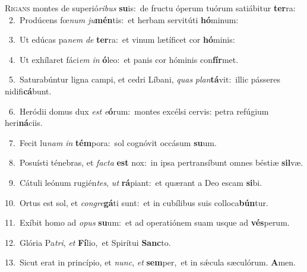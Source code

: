 \lettrine{\initial\textcolor{\initialcolor}{R}}{igans} montes de superió\-\textit{ri}\-\textit{bus} \textbf{su}\-is:~\star de fructu óperum tuórum satiábitur \textbf{ter}\-ra:\\
{\numbfont\textcolor{\numbcolor}{~2.}}~Prodúcens fœ\textit{num} \textit{ju}\-\textbf{mén}tis:~\star et herbam servitúti \textbf{hó}\-minum:\par
{\numbfont\textcolor{\numbcolor}{~3.}}~Ut edúcas pa\textit{nem} \textit{de} \textbf{ter}\-ra:~\star et vinum lætíficet cor \textbf{hó}\-minis:\par
{\numbfont\textcolor{\numbcolor}{~4.}}~Ut exhílaret fáci\textit{em} \textit{in} \textbf{ó}\-leo:~\star et panis cor hóminis con\-\textbf{fír}\-met.\par
{\numbfont\textcolor{\numbcolor}{~5.}}~Saturabúntur ligna campi, et cedri Líbani, \textit{quas} \textit{plan}\-\textbf{tá}vit:~\star illic pásseres nidifi\-\textbf{cá}\-bunt.\par
{\numbfont\textcolor{\numbcolor}{~6.}}~Heródii domus dux \textit{est} \textit{e}\-\textbf{ó}rum:~\star montes excélsi cervis: petra refúgium heri\-\textbf{ná}\-ciis.\par
{\numbfont\textcolor{\numbcolor}{~7.}}~Fecit lu\textit{nam} \textit{in} \textbf{tém}\-pora:~\star sol cognóvit occásum \textbf{su}\-um.\par
{\numbfont\textcolor{\numbcolor}{~8.}}~Posuísti ténebras, et \textit{fac}\-\textit{ta} \textbf{est} nox:~\star in ipsa pertransíbunt omnes béstiæ \textbf{sil}\-væ.\par
{\numbfont\textcolor{\numbcolor}{~9.}}~Cátuli leónum rugién\-\textit{tes}\-, \textit{ut} \textbf{rá}\-piant:~\star et quærant a Deo escam \textbf{si}\-bi.\par
{\numbfont\textcolor{\numbcolor}{10.}}~Ortus est sol, et \textit{con}\-\textit{gre}\textbf{gá}ti sunt:~\star et in cubílibus suis colloca\-\textbf{bún}\-tur.\par
{\numbfont\textcolor{\numbcolor}{11.}}~Exíbit homo ad \textit{o}\-\textit{pus} \textbf{su}\-um:~\star et ad operatiónem suam usque ad \textbf{vés}\-perum.\par
{\numbfont\textcolor{\numbcolor}{12.}}~Glória Pa\-\textit{tri}\-, \textit{et} \textbf{Fí}\-lio,~\star et Spirítui \textbf{Sanc}\-to.\par
{\numbfont\textcolor{\numbcolor}{13.}}~Sicut erat in princípio, et \textit{nunc}\-, \textit{et} \textbf{sem}\-per,~\star et in sǽcula sæculórum. \textbf{A}\-men.\par
